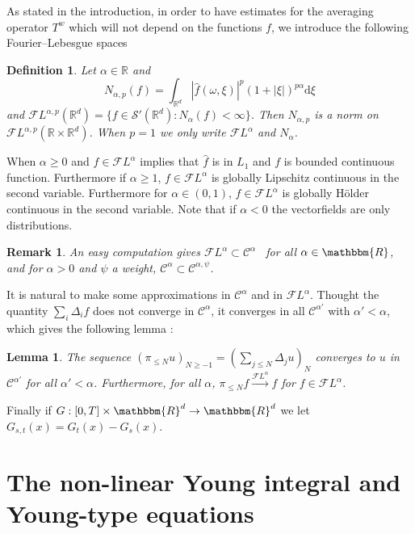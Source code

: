 \documentclass[a4paper,11pt]{article}
\newcommand{\mathd}{\mathrm{d}}
\newtheorem{definition}[theorem]{Definition}
\newtheorem{lemma}[theorem]{Lemma}
\newtheorem{remark}[theorem]{Remark}
\newcommand{\CC}{\mathscr C}
\newcommand{\CF}{\mathscr F}
\newcommand{\RR}{\mathbb R}
\begin{document}
As stated in the introduction, in order to have estimates for the averaging
operator $T^{w}$ which will not depend on the functions $f$, we introduce the
following Fourier--Lebesgue spaces

\begin{definition}
  Let $\alpha \in \RR$ and
  \[ N_{\alpha ,p} (f) = \int_{\RR^{d}} | \hat{f} ( \omega , \xi )|^{p}  ( 1+|
     \xi | )^{p \alpha} \mathd \xi \]
  and $\CF L^{\alpha ,p}  ( \RR^{d} ) = \{f \in \mathcal{S}' ( \RR^{d}
  ):N_{\alpha} (f)< \infty\}$. Then $N_{\alpha ,p}$ is a norm on $\CF
  L^{\alpha ,p}  ( \RR \times \RR^{d} )$. When $p=1$ we only write $\CF
  L^{\alpha}$ and $N_{\alpha}$. 
\end{definition}

When $\alpha \geqslant 0$ and $f \in \CF L^{\alpha}$ implies that $\hat{f}$ is
in $L_{1}$ and $f$ is bounded continuous function. Furthermore if $\alpha \ge
1$, $f \in \CF L^{\alpha}$ is globally Lipschitz continuous in the second
variable. Furthermore for $\alpha \in (0,1)$, $f \in \CF L^{\alpha}$ is
globally H\"older continuous in the second variable. Note that if $\alpha <0$
the vectorfields are only distributions.

\begin{remark}
  An easy computation gives $\CF L^{\alpha} \subset \CC^{\alpha}$ \ for all
  $\alpha \in \mathbbm{R}$, and for $\alpha >0$ and $\psi$ a weight,
  $\CC^{\alpha} \subset \CC^{\alpha , \psi}$.
\end{remark}

It is natural to make some approximations in $\CC^{\alpha}$ and in $\CF
L^{\alpha}$. Thought the quantity $\sum_{i} \Delta_{i} f$ does not converge in
$\CC^{\alpha}$, it converges in all $\CC^{\alpha'}$ with $\alpha' < \alpha$,
which gives the following lemma :

\begin{lemma}
  The sequence $( \pi_{\leqslant N} u )_{N \ge -1} = ( \sum_{j \leqslant N}
  \Delta_{j} u)_{N}$ converges to $u$ in $\CC^{\alpha'}$ for all $\alpha' <
  \alpha$. Furthermore, for all $\alpha$, $\pi_{\leqslant N} f
  \xrightarrow{\CF L^{\alpha}} f$ for $f \in \CF L^{\alpha}$.
\end{lemma}

Finally if $G: [ 0,T ] \times \mathbbm{R}^{d} \rightarrow \mathbbm{R}^{d}$ we
let $G_{s,t} ( x ) =G_{t} ( x ) -G_{s} ( x )$.

\section{The non-linear Young integral and Young-type
equations}\label{sec:young-ode}
\end{document}
